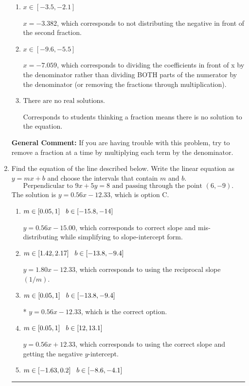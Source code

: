 \documentclass{extbook}[14pt]
\newcommand{\litem}[1]{\item #1

\rule{\textwidth}{0.4pt}}
\begin{document}
\begin{enumerate}
{\begin{enumerate}[label=\Alph*.]
* $x = -1.618$, which is the correct option.
\item \( x \in [-3.5, -2.1] \)

 $x = -3.382$, which corresponds to not distributing the negative in front of the second fraction.
\item \( x \in [-9.6, -5.5] \)

 $x = -7.059$, which corresponds to dividing the coefficients in front of x by the denominator rather than dividing BOTH parts of the numerator by the denominator (or removing the fractions through multiplication).
\item \( \text{There are no real solutions.} \)

Corresponds to students thinking a fraction means there is no solution to the equation.
\end{enumerate}

\textbf{General Comment:} If you are having trouble with this problem, try to remove a fraction at a time by multiplying each term by the denominator.
}
\litem{
Find the equation of the line described below. Write the linear equation as $ y=mx+b $ and choose the intervals that contain $m$ and $b$.
\[ \text{Perpendicular to } 9 x + 5 y = 8 \text{ and passing through the point } (6, -9). \]
The solution is \( y = 0.56x - 12.33 \), which is option C.\begin{enumerate}[label=\Alph*.]
\item \( m \in [0.05, 1] \hspace*{3mm} b \in [-15.8, -14] \)

 $y = 0.56x - 15.00$, which corresponds to correct slope and mis-distributing while simplifying to slope-intercept form.
\item \( m \in [1.42, 2.17] \hspace*{3mm} b \in [-13.8, -9.4] \)

 $y = 1.80x - 12.33$, which corresponds to using the reciprocal slope $(1/m)$.
\item \( m \in [0.05, 1] \hspace*{3mm} b \in [-13.8, -9.4] \)

* $y = 0.56x - 12.33$, which is the correct option.
\item \( m \in [0.05, 1] \hspace*{3mm} b \in [12, 13.1] \)

 $y = 0.56x + 12.33$, which corresponds to using the correct slope and getting the negative $y$-intercept.
\item \( m \in [-1.63, 0.2] \hspace*{3mm} b \in [-8.6, -4.1] \)


\end{enumerate}}
\end{enumerate}
\end{document}
